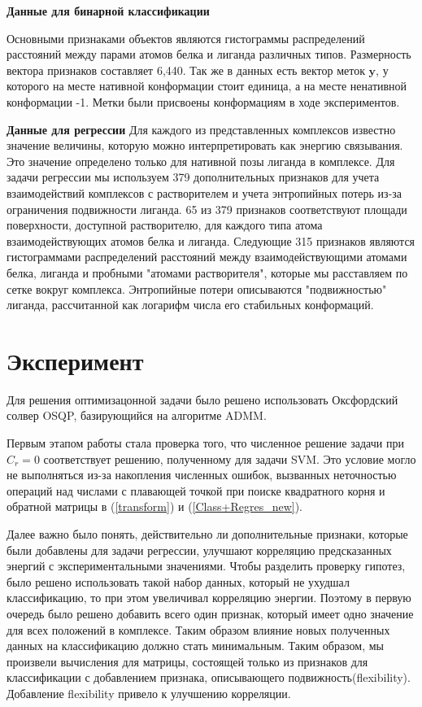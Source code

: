 \documentclass[CEJM,PDF]{Class+Reg_in_Molec_Docking} %
\begin{document}
\textbf{Данные для бинарной классификации}
\medskip

Основными признаками объектов являются гистограммы распределений расстояний между парами атомов белка и лиганда различных типов. Размерность вектора признаков составляет 6,440. Так же в данных есть вектор меток $\mathbf{y}$, у которого на месте нативной конформации стоит единица, а на месте ненативной конформации -1. Метки были присвоены конформациям в ходе экспериментов.

\textbf{Данные для регрессии}
\medskip
Для каждого из представленных комплексов известно значение величины, которую можно интерпретировать как энергию связывания. Это значение определено только для нативной позы лиганда в комплексе. 
%
Для задачи регрессии мы используем 379 дополнительных признаков для учета взаимодействий комплексов с растворителем и учета энтропийных потерь из-за ограничения подвижности лиганда. 65 из 379 признаков соответствуют площади поверхности, доступной растворителю, для каждого типа атома взаимодействующих атомов белка и лиганда. Следующие 315 признаков являются гистограммами распределений расстояний между взаимодействующими атомами белка, лиганда и пробными "атомами растворителя", которые мы расставляем по сетке вокруг комплекса. Энтропийные потери описываются "подвижностью" лиганда, рассчитанной как логарифм числа его стабильных конформаций.


\section{Эксперимент}
Для решения оптимизацонной задачи было решено использовать Оксфордский солвер OSQP\cite{osqp,osqp-codegen}, базирующийся на алгоритме ADMM\cite{osqp-infeasibility}.

\hspace{1cm} Первым этапом работы стала проверка того, что численное решение задачи при $C_r = 0$ соответствует решению, полученному для задачи SVM. Это условие могло не выполняться из-за накопления численных ошибок, вызванных неточностью операций над числами с плавающей точкой при поиске квадратного корня и обратной матрицы в (\ref{transform}) и (\ref{Class+Regres_new}). 

Далее важно было понять, действительно ли дополнительные признаки, которые были добавлены для задачи регрессии, улучшают корреляцию предсказанных энергий с экспериментальными значениями. Чтобы разделить проверку гипотез, было решено использовать такой набор данных, который не ухудшал классификацию, то при этом увеличивал корреляцию энергии. Поэтому в первую очередь было решено добавить всего один признак, который имеет одно значение для всех положений в комплексе. Таким образом влияние новых полученных данных на классификацию должно стать минимальным.
Таким образом, мы произвели вычисления для матрицы, состоящей только из признаков для классификации с добавлением признака, описывающего подвижность(flexibility). Добавление flexibility привело к улучшению корреляции.
\end{document}
